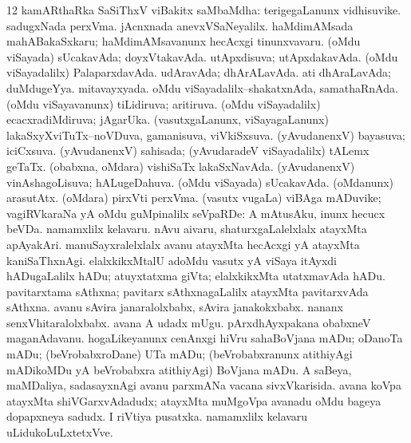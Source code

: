 \num{12} kamARthaRka SaSiThxV viBakitx saMbaMdha:  terigegaLanunx vidhisuvike.  sadugxNada perxVma.  jAcnxnada anevxVSaNeyalilx.  haMdimAMsada mahABakaSxkaru; haMdimAMsavanunx hecAcxgi tinunxvavaru.  (oMdu viSayada) sUcakavAda; doyxVtakavAda.  utApxdisuva; utApxdakavAda.  (oMdu viSayadalilx) PalaparxdavAda.  udAravAda; dhArALavAda.  ati dhAraLavAda; duMdugeYya.  mitavayxyada.  oMdu viSayadalilx--shakatxnAda, samathaRnAda.  (oMdu viSayavanunx) tiLidiruva; aritiruva.  (oMdu viSayadalilx) ecacxradiMdiruva; jAgarUka.  (vasutxgaLanunx, viSayagaLanunx) lakaSxyXviTuTx--noVDuva, gamanisuva, viVkiSxsuva.  (yAvudanenxV) bayasuva; iciCxsuva.  (yAvudanenxV) sahisada; (yAvudaradeV viSayadalilx) tALemx geTaTx.  (obabxna, oMdara) vishiSaTx lakaSxNavAda.  (yAvudanenxV) vinAshagoLisuva; hALugeDahuva.  (oMdu viSayada) sUcakavAda.  (oMdanunx) arasutAtx.  (oMdara) pirxVti perxVma. 
 (vasutx \mo vugaLa) viBAga mADuvike; vagiRVkaraNa yA oMdu guMpinalilx seVpaRDe:  A mAtusAku, inunx hecucx beVDa.  
\banum
{} namamxlilx kelavaru. 
 nAvu aivaru,  shaturxgaLalelxlalx atayxMta apAyakAri.  manuSayxralelxlalx avanu atayxMta hecAcxgi yA atayxMta kaniSaThxnAgi.  elalxkikxMtalU adoMdu vasutx yA viSaya itAyxdi  hADugaLalilx hADu; atuyxtatxma giVta; elalxkikxMta utatxmavAda hADu.  pavitarxtama sAthxna; pavitarx sAthxnagaLalilx atayxMta pavitarxvAda sAthxna.  avanu sAvira janaralolxbabx, sAvira janakokxbabx.  nananx senxVhitaralolxbabx.  avana A udadx mUgu.  pArxdhAyxpakana obabxneV maganAdavanu.  hogaLikeyanunx cenAnxgi hiVru  sahaBoVjana mADu; oDanoTa mADu; (beVrobabxroDane) UTa mADu; (beVrobabxranunx atithiyAgi mADikoMDu yA beVrobabxra atithiyAgi) BoVjana mADu.  A saBeya, maMDaliya, sadasayxnAgi avanu parxmANa vacana sivxVkarisida.  avana koVpa atayxMta shiVGarxvAdadudx; atayxMta muMgoVpa avanadu  oMdu bageya dopapxneya sadudx.  I riVtiya pusatxka.  namamxlilx kelavaru uLidukoLuLxtetxVve. 

